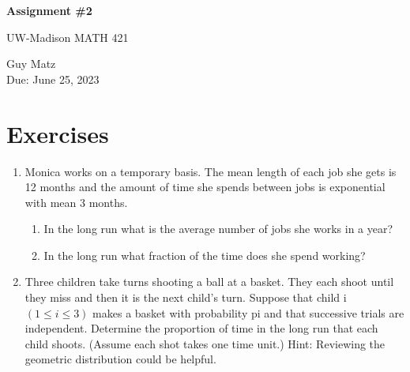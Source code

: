 \documentclass{article} %
\theoremstyle{plain}
\theoremstyle{case}
\begin{document}
\begin{center}
\Large{\textbf{Assignment \#2}
            
UW-Madison MATH 421} %
\vspace{5pt}
        
\normalsize{  Guy Matz%
        \\ Due: June 25, 2023}
\vspace{15pt}
\end{center}

\section*{Exercises}%
\begin{enumerate}[label={\fbox{\textbf{Exercise \#\arabic* :}}}]
  \item Monica works on a temporary basis. The mean length of each job she
    gets is 12 months and the amount of time she spends between jobs
    is exponential with mean 3 months.
    \begin{enumerate}
      \item In the long run what is the average number of jobs she works in a year?
      \item  In the long run what fraction of the time does she spend working?
    \end{enumerate}
  \newpage
  \item Three children take turns shooting a ball at a basket. They each shoot until they miss and then
it is the next child’s turn. Suppose that child i $(1 \leq i \leq 3)$ makes a basket with probability pi
and that successive trials are independent. Determine the proportion of time in the long run
that each child shoots. (Assume each shot takes one time unit.)
Hint: Reviewing the geometric distribution could be helpful.


\end{enumerate}
\end{document}
